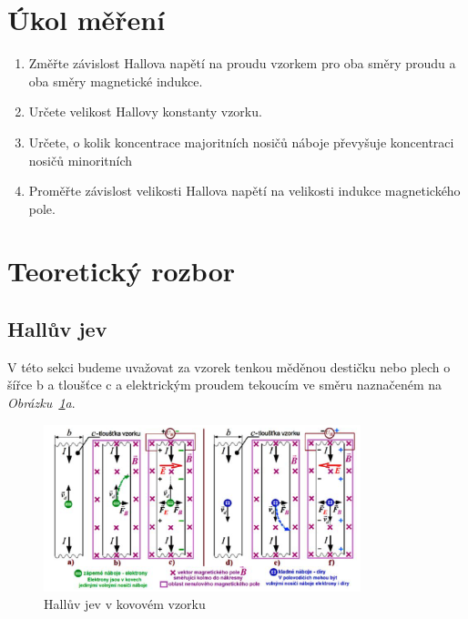 \documentclass{praktikum}
\begin{document}
\maketitle
\vspace{0.5 cm}


\section{Úkol měření}
\begin{enumerate}
\item Změřte závislost Hallova napětí na proudu vzorkem pro oba směry proudu a oba směry magnetické indukce.
\item Určete velikost Hallovy konstanty vzorku.
\item Určete, o kolik koncentrace majoritních nosičů náboje převyšuje koncentraci nosičů minoritních
\item Proměřte závislost velikosti Hallova napětí na velikosti indukce magnetického pole.
\end{enumerate}
\section{Teoretický rozbor}

\subsection{Hallův jev}
V této sekci budeme uvažovat za vzorek tenkou měděnou destičku nebo plech o šířce b a tloušťce c a elektrickým proudem tekoucím ve směru naznačeném na \textit{Obrázku~\ref{img:hall_kovy}a}.

\begin{figure}[H]

\centering
\includegraphics[width=0.82\textwidth]{hall_kovy}
\caption{Hallův jev v kovovém vzorku}\label{img:hall_kovy}
\end{figure}
\end{document}
